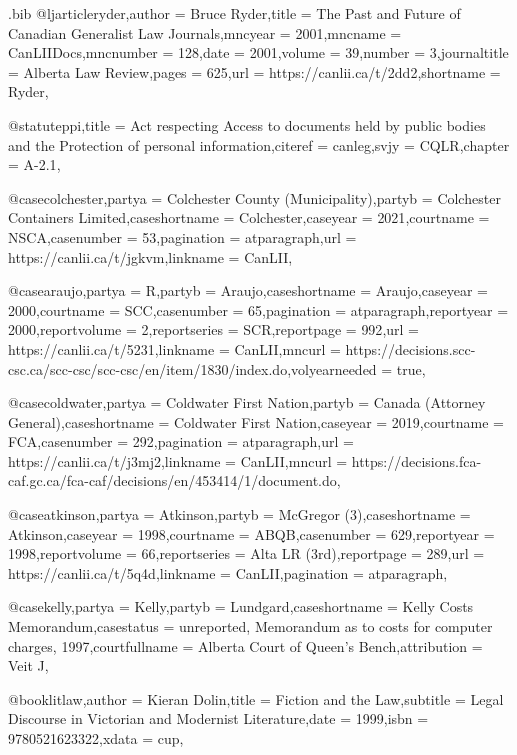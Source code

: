 \begin{filecontents*}[overwrite]{\jobname.bib}
@ljarticle{ryder,author =  {Bruce Ryder},title =  {The Past and Future of Canadian Generalist Law Journals},mncyear =  {2001},mncname =  {CanLIIDocs},mncnumber =  {128},date =  {2001},volume =  {39},number =  {3},journaltitle =  {Alberta Law Review},pages =  {625},url =  {https://canlii.ca/t/2dd2},shortname =  {Ryder},}

@statute{ppi,title =  {Act respecting Access to documents held by public bodies and the Protection of personal information},citeref =  {canleg},svjy =  {CQLR},chapter =  {A-2.1},}


@case{colchester,partya =  {Colchester County (Municipality)},partyb =  {Colchester Containers Limited},caseshortname =  {Colchester},caseyear =  {2021},courtname =  {NSCA},casenumber =  {53},pagination =  {atparagraph},url =  {https://canlii.ca/t/jgkvm},linkname =  {CanLII},}



@case{araujo,partya =  {R},partyb =  {Araujo},caseshortname =  {Araujo},caseyear =  {2000},courtname =  {SCC},casenumber =  {65},pagination =  {atparagraph},reportyear =  {2000},reportvolume =  {2},reportseries =  {SCR},reportpage =  {992},url =  {https://canlii.ca/t/5231},linkname =  {CanLII},mncurl =  {https://decisions.scc-csc.ca/scc-csc/scc-csc/en/item/1830/index.do},volyearneeded =  {true}, }

@case{coldwater,partya =  {Coldwater First Nation},partyb =  {Canada (Attorney General)},caseshortname =  {Coldwater First Nation},caseyear =  {2019},courtname =  {FCA},casenumber =  {292},pagination =  {atparagraph},url =  {https://canlii.ca/t/j3mj2},linkname =  {CanLII},mncurl =  {https://decisions.fca-caf.gc.ca/fca-caf/decisions/en/453414/1/document.do},}


@case{atkinson,partya =  {Atkinson},partyb =  {McGregor (3)},caseshortname =  {Atkinson},caseyear =  {1998},courtname =  {ABQB},casenumber =  {629},reportyear =  {1998},reportvolume =  {66},reportseries =  {Alta LR (3rd)},reportpage =  {289},url =  {https://canlii.ca/t/5q4d},linkname =  {CanLII},pagination =  {atparagraph},}


@case{kelly,partya =  {Kelly},partyb =  {Lundgard},caseshortname =  {Kelly Costs Memorandum},casestatus =  {unreported, Memorandum as to costs for computer charges, 1997},courtfullname =  {Alberta Court of Queen's Bench},attribution =  {Veit J},}

@book{litlaw,author =  {Kieran Dolin},title =  {Fiction and the Law},subtitle =  {Legal Discourse in Victorian and Modernist Literature},date =  {1999},isbn =  {9780521623322},xdata =  {cup},}


\end{filecontents*}
